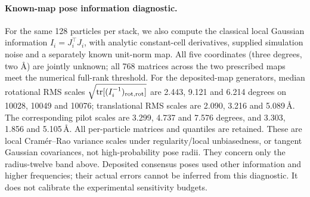 \paragraph{Known-map pose information diagnostic.}
For the same 128 particles per stack, we also compute the classical local
Gaussian information $I_i=J_i^\top J_i$, with analytic constant-cell derivatives,
supplied simulation noise and a separately known unit-norm map. All five
coordinates (three degrees, two \AA) are jointly unknown; all 768 matrices
across the two prescribed maps meet the numerical full-rank threshold.
For the deposited-map generators, median rotational RMS scales
$\sqrt{\operatorname{tr}[(I_i^{-1})_{\rm rot,rot}]}$ are 2.443, 9.121 and
6.214 degrees on 10028, 10049 and 10076; translational RMS scales are
2.090, 3.216 and 5.089\,\AA. The corresponding pilot scales are
3.299, 4.737 and 7.576 degrees, and 3.303, 1.856 and 5.105\,\AA.
All per-particle matrices and quantiles are retained. These are local
Cram\'er--Rao variance scales under regularity/local unbiasedness, or tangent
Gaussian covariances, not high-probability pose radii. They concern only the
radius-twelve band above. Deposited consensus poses used other information
and higher frequencies; their actual errors cannot be inferred from this
diagnostic. It does not calibrate the experimental sensitivity budgets.
